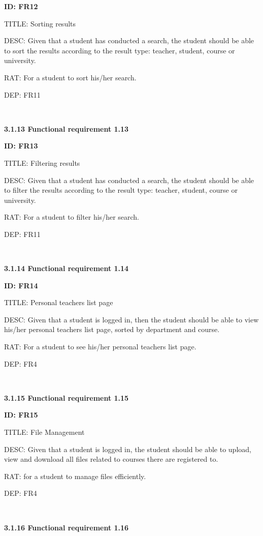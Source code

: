 \documentclass[12pt,a4paper]{article}
\begin{document}
\begin{flushleft}
        \textbf{ID: FR12}

        TITLE: Sorting results

        DESC: Given that a student has conducted a search, the student should be
        able to sort the results according to the result type: teacher, student,
        course or university.

        RAT: For a student to sort his/her search.

        DEP: FR11

        \

        \textbf{3.1.13 Functional requirement 1.13}

        \textbf{ID: FR13}

        TITLE: Filtering results

        DESC: Given that a student has conducted a search, the student should be
        able to filter the results according to the result type: teacher,
        student, course or university.

        RAT: For a student to filter his/her search.

        DEP: FR11

        \

        \textbf{3.1.14 Functional requirement 1.14}

        \textbf{ID: FR14}

        TITLE: Personal teachers list page

        DESC: Given that a student is logged in, then the student should be able
        to view his/her personal teachers list page, sorted by department and
        course.

        RAT: For a student to see his/her personal teachers list page.

        DEP: FR4

        \

        \textbf{3.1.15 Functional requirement 1.15}

        \textbf{ID: FR15}

        TITLE: File Management

        DESC: Given that a student is logged in, the student should be able to upload, view and download all files related to courses there are registered to.

        RAT: for a student to manage files efficiently.

        DEP: FR4

        \

        \textbf{3.1.16 Functional requirement 1.16}


\end{flushleft}
\end{document}
